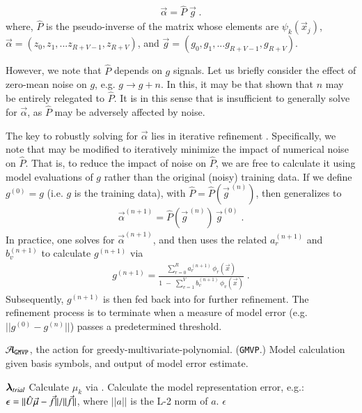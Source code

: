 \documentclass[twocolumn,aps,prd,floatfix,preprintnumbers,a4paper,nofootinbib,
superscriptaddress,10pt]{revtex4-1}
\def\gmvp#1{greedy-multivariate-polynomial#1
  (\texttt{GMVP}#1)\gdef\gmvp{\texttt{GMVP}}}
\begin{document}
%
\begin{align}
  \label{eq:pinv2}
  \vec{\alpha} = \hat{P} \; \vec{g} \;.
\end{align}
%
where, $\hat{P}$ is the pseudo-inverse of the matrix whose elements are $\psi_k(\vec{x}_j)$, $\vec\alpha = ( z_0, z_1, ... z_{R+V-1},z_{R+V} )$, and $\vec{g} = ( g_0, g_1, ... g_{R+V-1},g_{R+V} )$.
%
\par However, we note that $\hat{P}$ depends on $g$ signals.
%
Let us briefly consider the effect of zero-mean noise on $g$, e.g. $g \rightarrow g+n$.
%
In this, it may be that shown that $n$ may be entirely relegated to $\hat{P}$.
%
It is in this sense that  is insufficient to generally solve for $\vec{\alpha}$, as $\hat{P}$ may be adversely affected by noise.
%
%
\par The key to robustly solving for $\vec{\alpha}$ lies in iterative refinement \cite{Press:1992:NRC:148286}.
%
Specifically, we note that  may be modified to iteratively minimize the impact of numerical noise on $\hat{P}$.
%
That is, to reduce the impact of noise on $\hat{P}$, we are free to calculate it using model evaluations of $g$ rather than the original (noisy) training data.
%
If we define $g^{(0)}=g$ (i.e. $g$ is the training data), with $\hat{P} = \hat{P}( \vec{g}^{\,(n)} )$, then  generalizes to
%
\begin{align}
  \label{eq:pinv3}
  \vec{\alpha}^{(n+1)} = \hat{P}(\vec{g}^{\,(n)}) \, \vec{g}^{(0)}\;.
\end{align}
%
In practice, one solves  for $\vec{\alpha}^{(n+1)}$, and then uses the related $a_r^{(n+1)}$ and $b_v^{(n+1)}$ to calculate $g^{(n+1)}$ via
%
\begin{align}
  \label{eq:rat4}
  g^{(n+1)} =  \frac{ \sum_{r=0}^{R} a^{(n+1)}_r \, \phi_{r}(\vec{x}) }{ 1\;-\;  \sum_{v=1}^{V} b^{(n+1)}_v \, \phi_{v}(\vec{x}) } \; .
\end{align}
%
Subsequently, $g^{(n+1)}$ is then fed back into  for further refinement.
%
The refinement process is to terminate when a measure of model error (e.g. $||g^{(0)}-g^{(n)}||$) passes a predetermined threshold.
%
%
%
{\scriptsize
\begin{algorithm}[H]
  \caption{$\mathcal{A}_{\gmvp}$, the action for \gmvp. Model calculation given basis symbols, and output of model error estimate.}
  \label{alg:A_gmvp}
  \begin{algorithmic}[1]
     ${\bm{\lambda}}_{trial}$
    \vskip 10pt
    \State Calculate $\mu_k$ via .
    \State Calculate the model representation error, e.g.: $\epsilon = ||\hat{U} \vec{\mu} - \vec{f}||/||\vec{f}||$, where $||a||$ is the L-2 norm of $a$.
    \vskip 10pt
     $\epsilon$
  \end{algorithmic}
\end{algorithm}
}
\end{document}
